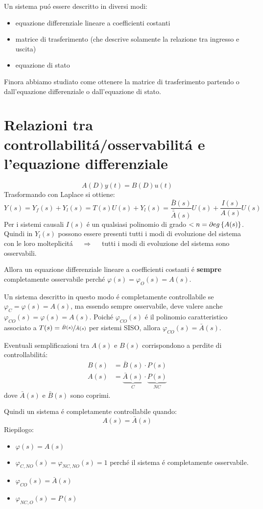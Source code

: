 \documentclass[../main.tex]{subfiles}
\begin{document}
	Un sistema pu\'o essere descritto in diversi modi:
	\begin{itemize}
		\item 
			equazione differenziale lineare a coefficienti costanti
		\item 
			matrice di trasferimento (che descrive solamente la relazione tra ingresso e uscita)
		\item 
			equazione di stato
	\end{itemize}
	
	Finora abbiamo studiato come ottenere la matrice di trasferimento partendo o dall'equazione differenziale o dall'equazione di stato.
	
	\section{Relazioni tra controllabilit\'a/osservabilit\'a e l'equazione differenziale}
		\[
			A(D)y(t) = B(D)u(t)
		\]
		Trasformando con Laplace si ottiene:
		\[
			Y(s) = Y_f(s) + Y_l(s) = T(s)U(s) + Y_l(s) = \dfrac{\bar B(s)}{\bar{\bar{A}}(s)} U(s) + \dfrac{I(s)}{A(s)} U(s)
		\]
		Per i sistemi causali $ I(s) $ \'e un qualsiasi polinomio di grado $ < n = \partial eg \left\lbrace A(s) \right\rbrace $. Quindi in $ Y_l(s) $ possono essere presenti tutti i modi di evoluzione del sistema con le loro molteplicit\'a $ \quad\Rightarrow\quad $ tutti i modi di evoluzione del sistema sono osservabili.
		
		Allora un equazione differenziale lineare a coefficienti costanti \'e \textbf{sempre} completamente osservabile perch\'e $ \varphi(s) = \varphi_O(s) = A(s) $.
		
		Un sistema descritto in questo modo \'e completamente controllabile se $ \varphi_C = \varphi(s) = A(s) $, ma essendo sempre osservabile, deve valere anche  $ \varphi_{CO}(s) = \varphi(s) = A(s) $. Poich\'e $ \varphi_{CO}(s) $ \'e il polinomio caratteristico associato a $ T(s) = \sfrac{\bar B(s)}{\bar A(s)} $ per sistemi SISO, allora $ \varphi_{CO}(s) = \bar A(s) $.
		
		Eventuali semplificazioni tra $ A(s) $ e $ B(s) $ corrispondono a perdite di controllabilit\'a:
		\begin{align*}
			B(s) &= \bar B(s) \cdot P(s)\\
			A(s) &= \underbrace{\bar{A}(s)}_{C} \cdot \underbrace{P(s)}_{NC}
		\end{align*}
		dove $ \bar A(s) $ e $ \bar B(s) $ sono coprimi.
		
		Quindi un sistema \'e completamente controllabile quando: 
		\[
			A(s) = \bar A(s)
		\]
		\newline
		Riepilogo:
		\begin{itemize}
			\item $ \varphi(s) = A(s) $
			\item $ \varphi_{C,NO}(s) = \varphi_{NC,NO}(s) = 1 $ perch\'e il sistema \'e completamente osservabile.
			\item $ \varphi_{CO}(s) = \bar A(s) $
			\item $ \varphi_{NC,O}(s) = P(s) $
		\end{itemize}
\end{document}
